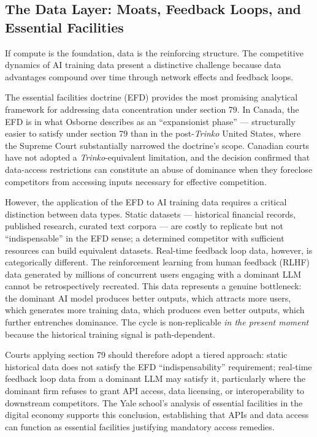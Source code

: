 \subsection{The Data Layer: Moats, Feedback Loops, and Essential Facilities}

If compute is the foundation, data is the reinforcing structure. The competitive dynamics of AI training data present a distinctive challenge because data advantages compound over time through network effects and feedback loops.

The essential facilities doctrine (EFD) provides the most promising analytical framework for addressing data concentration under section 79. In Canada, the EFD is in what Osborne describes as an ``expansionist phase'' --- structurally easier to satisfy under section 79 than in the post-\textit{Trinko} United States, where the Supreme Court substantially narrowed the doctrine's scope. Canadian courts have not adopted a \textit{Trinko}-equivalent limitation, and the  decision confirmed that data-access restrictions can constitute an abuse of dominance when they foreclose competitors from accessing inputs necessary for effective competition.

However, the application of the EFD to AI training data requires a critical distinction between data types. Static datasets --- historical financial records, published research, curated text corpora --- are costly to replicate but not ``indispensable'' in the EFD sense; a determined competitor with sufficient resources can build equivalent datasets. Real-time feedback loop data, however, is categorically different. The reinforcement learning from human feedback (RLHF) data generated by millions of concurrent users engaging with a dominant LLM cannot be retrospectively recreated. This data represents a genuine bottleneck: the dominant AI model produces better outputs, which attracts more users, which generates more training data, which produces even better outputs, which further entrenches dominance. The cycle is non-replicable \textit{in the present moment} because the historical training signal is path-dependent.

Courts applying section 79 should therefore adopt a tiered approach: static historical data does not satisfy the EFD ``indispensability'' requirement; real-time feedback loop data from a dominant LLM may satisfy it, particularly where the dominant firm refuses to grant API access, data licensing, or interoperability to downstream competitors. The Yale school's analysis of essential facilities in the digital economy supports this conclusion, establishing that APIs and data access can function as essential facilities justifying mandatory access remedies.

